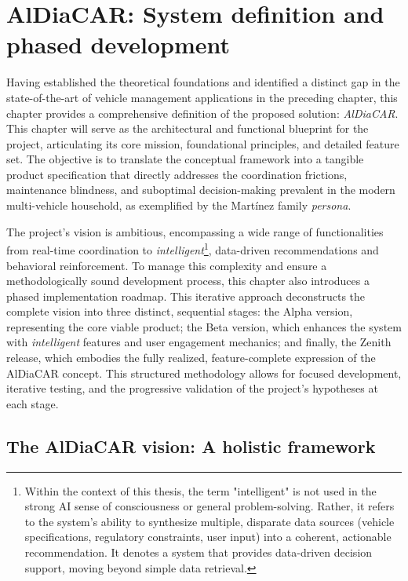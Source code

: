 \chapter{AlDiaCAR: System definition and phased development}

Having established the theoretical foundations and identified a distinct gap in the state-of-the-art of vehicle management applications in the preceding chapter, this chapter provides a comprehensive definition of the proposed solution: \textit{AlDiaCAR}. This chapter will serve as the architectural and functional blueprint for the project, articulating its core mission, foundational principles, and detailed feature set. The objective is to translate the conceptual framework into a tangible product specification that directly addresses the coordination frictions, maintenance blindness, and suboptimal decision-making prevalent in the modern multi-vehicle household, as exemplified by the Martínez family \textit{persona}.

\textgap

The project's vision is ambitious, encompassing a wide range of functionalities from real-time coordination to \textit{intelligent}\footnote{Within the context of this thesis, the term "intelligent" is not used in the strong AI sense of consciousness or general problem-solving. Rather, it refers to the system's ability to synthesize multiple, disparate data sources (vehicle specifications, regulatory constraints, user input) into a coherent, actionable recommendation. It denotes a system that provides data-driven decision support, moving beyond simple data retrieval.}, data-driven recommendations and behavioral reinforcement. To manage this complexity and ensure a methodologically sound development process, this chapter also introduces a phased implementation roadmap. This iterative approach deconstructs the complete vision into three distinct, sequential stages: the Alpha version, representing the core viable product; the Beta version, which enhances the system with \textit{intelligent} features and user engagement mechanics; and finally, the Zenith release, which embodies the fully realized, feature-complete expression of the AlDiaCAR concept. This structured methodology allows for focused development, iterative testing, and the progressive validation of the project's hypotheses at each stage.

\section{The AlDiaCAR vision: A holistic framework}

